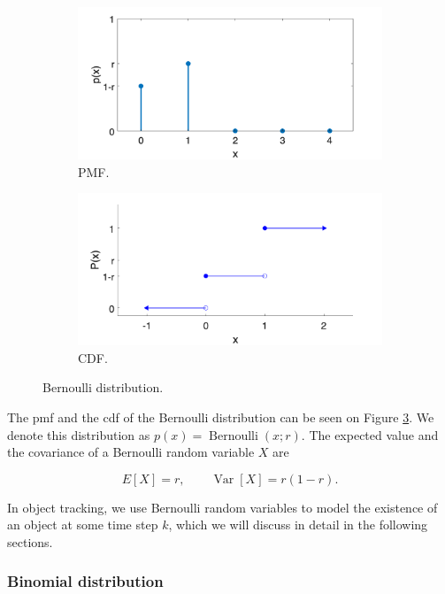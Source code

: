 \begin{figure}
\centering
\begin{subfigure}{.5\textwidth}
  \centering
  \includegraphics[width=.9\linewidth]{figures/bern.pmf.png}
  \caption{PMF.}
  \label{fig:bern:pmf}
\end{subfigure}\hfill
\begin{subfigure}{.5\textwidth}
  \centering
  \includegraphics[width=.9\linewidth]{figures/bern.cdf.png}
  \caption{CDF.}
  \label{fig:bern:cdf}
\end{subfigure}
\caption{Bernoulli distribution.}
\label{fig:bern}
\end{figure}

The pmf and the cdf of the Bernoulli distribution can be seen on Figure \ref{fig:bern}.
We denote this distribution as $p(x) = \operatorname{Bernoulli}(x;r)$.
The expected value and the covariance of a Bernoulli random variable $X$ are

$$
E[X] = r, \qquad \operatorname{Var}[X] = r(1-r).
$$

In object tracking, we use Bernoulli random variables to model the existence of
an object at some time step $k$, which we will discuss in detail in the following
sections.

\subsubsection{Binomial distribution}


